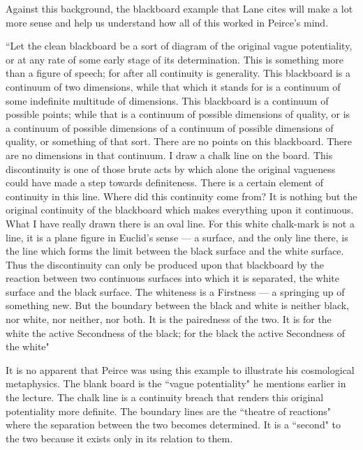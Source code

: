 \documentclass[12pt]{article}
\begin{document}
Against this background, the blackboard example that Lane cites will make a lot more sense and help us understand how all of this worked in Peirce's mind.
\begin{singlespace}
``Let the clean blackboard be a sort of diagram of the original vague potentiality, or at any rate of some early stage of its determination. This is something more than a figure of speech; for after all continuity is generality. This blackboard is a continuum of two dimensions, while that which it stands for is a continuum of some indefinite multitude of dimensions. This blackboard is a continuum of possible points; while that is a continuum of possible dimensions of quality, or is a continuum of possible dimensions of a continuum of possible dimensions of quality, or something of that sort. There are no points on this blackboard. There are no dimensions in that continuum. I draw a chalk line on the board. This discontinuity is one of those brute acts by which alone the original vagueness could have made a step towards definiteness. There is a certain element of continuity in this line. Where did this continuity come from? It is nothing but the original continuity of the blackboard which makes everything upon it continuous. What I have really drawn there is an oval line. For this white chalk-mark is not a line, it is a plane figure in Euclid's sense — a surface, and the only line there, is the line which forms the limit between the black surface and the white surface. Thus the discontinuity can only be produced upon that blackboard by the reaction between two continuous surfaces into which it is separated, the white surface and the black surface. The whiteness is a Firstness — a springing up of something new. But the boundary between the black and white is neither black, nor white, nor neither, nor both. It is the pairedness of the two. It is for the white the active Secondness of the black; for the black the active Secondness of the white"
\end{singlespace}
It is no apparent that Peirce was using this example to illustrate his cosmological metaphysics. The blank board is the ``vague potentiality" he mentions earlier in the lecture. The chalk line is a continuity breach that renders this original potentiality more definite. The boundary lines are the ``theatre of reactions" where the separation between the two becomes determined. It is a ``second" to the two because it exists only in its relation to them.
\end{document}
